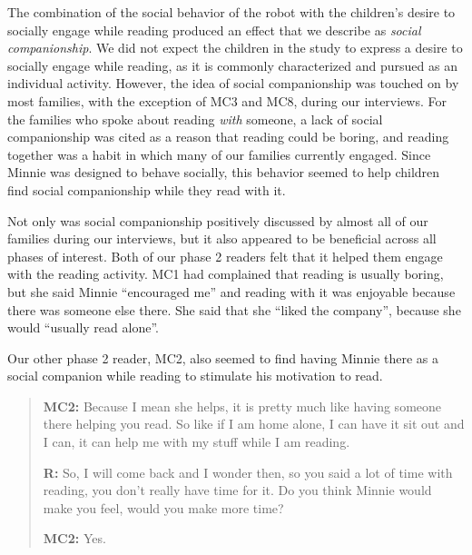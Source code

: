 \documentclass{sigchi}
\begin{document}
The combination of the social behavior of the robot with the children's desire to socially engage while reading produced an effect that we describe as \textit{social companionship}. We did not expect the children in the study to express a desire to socially engage while reading, as it is commonly characterized and pursued as an individual activity. However, the idea of social companionship was touched on by most families, with the exception of MC3 and MC8, during our interviews. For the families who spoke about reading \textit{with} someone, a lack of social companionship was cited as a reason that reading could be boring, and reading together was a habit in which many of our families currently engaged. Since Minnie was designed to behave socially, this behavior seemed to help children find social companionship while they read with it. 

Not only was social companionship positively discussed by almost all of our families during our interviews, but it also appeared to be beneficial across all phases of interest. Both of our phase 2 readers felt that it helped them engage with the reading activity. MC1 had complained that reading is usually boring, but she said Minnie ``encouraged me'' and reading with it was enjoyable because there was someone else there. {\color{blue} She said that she ``liked the company'', because she would ``usually read alone''.}

Our other phase 2 reader, MC2, also seemed to find having Minnie there as a social companion while reading to stimulate his motivation to read.

	 \begin{quote}
		\textbf{MC2:} Because I mean she helps, it is pretty much like having someone there helping you read. So like if I am home alone, I can have it sit out and I can, it can help me with my stuff while I am reading. 
	
		\textbf{R:} So, I will come back and I wonder then, so you said a lot of time with reading, you don't really have time for it. Do you think Minnie would make you feel, would you make more time? 
		
		\textbf{MC2:} Yes. 
 	\end{quote}
 
\end{document}
